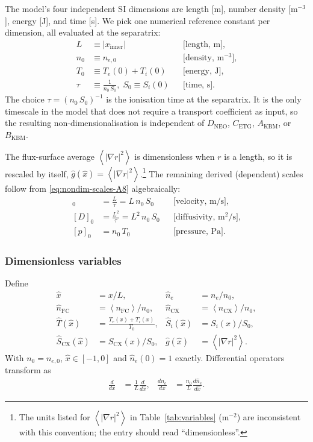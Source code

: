 \documentclass[twocolumn,secnumarabic,amssymb, nobibnotes, aps, prd]{revtex4-2}
\renewcommand{\ne}{n_{e}}  %
\newcommand{\nfc}{n_{\mathrm{FC}}}
\newcommand{\ncx}{n_{\mathrm{CX}}}
\newcommand{\Si}{S_{i}}
\newcommand{\Scx}{S_{\mathrm{CX}}}
\newcommand{\fsa}[1]{\left\langle #1 \right\rangle}
\newcommand{\gradrsq}{\fsa{|\nabla r|^{2}}}
\newcommand{\xin}{x_{\mathrm{inner}}}
\begin{document}
The model's four independent SI dimensions are length [m], number
density [m$^{-3}$], energy [J], and time [s]. We pick one numerical
reference constant per dimension, all evaluated at the separatrix:
\begin{subequations}
\label{eq:nondim-scales-A8}
\begin{align}
  L     &\equiv |\xin|
        &&\text{[length, m],} \\
  n_{0} &\equiv n_{e,0}
        &&\text{[density, m$^{-3}$],} \\
  T_{0} &\equiv T_{e}(0) + T_{i}(0)
        &&\text{[energy, J],} \\
  \tau  &\equiv \frac{1}{n_{0}\,S_{0}},\;
              S_{0} \equiv \Si(0)
        &&\text{[time, s].}
\end{align}
\end{subequations}
The choice $\tau = (n_{0}\,S_{0})^{-1}$ is the ionisation time at the
separatrix. It is the only timescale in the model that does not
require a transport coefficient as input, so the resulting
non-dimensionalisation is independent of $D_{\mathrm{NEO}}$,
$C_{\mathrm{ETG}}$, $A_{\mathrm{KBM}}$, or $B_{\mathrm{KBM}}$.

The flux-surface average $\fsa{|\nabla r|^{2}}$ is dimensionless when
$r$ is a length, so it is rescaled by itself,
$\hat{g}(\hat{x}) = \gradrsq$.\footnote{The units listed for
$\fsa{|\nabla r|^{2}}$ in Table~\ref{tab:variables} (m$^{-2}$) are
inconsistent with this convention; the entry should read
``dimensionless''.}
The remaining derived (dependent) scales follow from
\eqref{eq:nondim-scales-A8} algebraically:
\begin{align}
  [V]_{0} &= \frac{L}{\tau} = L\,n_{0}\,S_{0}
          &&\text{[velocity, m/s],}\\
  [D]_{0} &= \frac{L^{2}}{\tau} = L^{2}\,n_{0}\,S_{0}
          &&\text{[diffusivity, m$^{2}$/s],}\\
  [p]_{0} &= n_{0}\,T_{0}
          &&\text{[pressure, Pa].}
\end{align}

\subsubsection{Dimensionless variables}

Define
\begin{align}
  \hat{x}        &= x/L,
  & \hat{n}_{e}    &= \ne/n_{0},
  \\
  \hat{n}_{\mathrm{FC}}  &= \fsa{\nfc}/n_{0},
  & \hat{n}_{\mathrm{CX}} &= \fsa{\ncx}/n_{0},
  \\
  \hat{T}(\hat{x}) &= \frac{T_{e}(x) + T_{i}(x)}{T_{0}},
  & \hat{S}_{i}(\hat{x}) &= \Si(x)/S_{0},
  \\
  \hat{S}_{\mathrm{CX}}(\hat{x}) &= \Scx(x)/S_{0},
  & \hat{g}(\hat{x})     &= \gradrsq.
\end{align}
With $n_{0}=n_{e,0}$, $\hat{x}\in[-1,0]$ and $\hat{n}_{e}(0)=1$
exactly. Differential operators transform as
\begin{align}
  \frac{d}{dx}      &= \frac{1}{L}\frac{d}{d\hat{x}},
  &
  \frac{d\ne}{dx}   &= \frac{n_{0}}{L}\frac{d\hat{n}_{e}}{d\hat{x}}.
  \label{eq:chain-A8}
\end{align}
\end{document}
